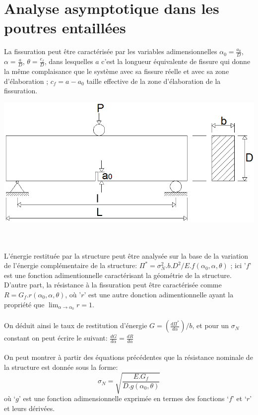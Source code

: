 \documentclass[12pt]{report}
\begin{document}
\section{Analyse asymptotique dans les poutres entaillées}
La fissuration peut être caractérisée
par les variables adimensionnelles $\alpha_0 = \frac{a_0}{D}$, $\alpha = \frac{a}{D}$, $\theta = \frac{c_f}{D}$, dans lesquelles \og$a$\fg{} c'est la longueur équivalente de fissure qui donne la même complaisance que le système avec sa fissure réelle et
avec sa zone d'élaboration ; $c_f=a-a_0$ taille effective de la zone d'élaboration de la fissuration.
\\
\begin{center}
\includegraphics[scale=0.5]{figure1}
\end{center}
\\\\
L'énergie restituée par la structure peut être analysée sur la base de la variation de
l'énergie complémentaire de la structure: $\Pi^* = \sigma_{N}^{2}.b.D^2/E.f(\alpha_0, \alpha, \theta)$ ; ici '$f$' est une fonction adimentionnelle caractérisant la géométrie de la structure. D'autre part, la résistance à la
fissuration peut être caractérisée comme $R=G_f.r(\alpha_0, \alpha, \theta)$, où '$r$' est une autre donction adimentionnelle ayant la propriété que $\lim_{\alpha \to \alpha_0} r = 1$.\\\\
On déduit ainsi le taux de restitution d'énergie $G = (\frac{d\Pi^*}{d\alpha})/b$, et pour un $\sigma_N$ constant on peut écrire le suivant: $\frac{dG}{d\alpha} = \frac{dR}{d\alpha}$
\\\\
On peut montrer à partir des équations précédentes que la résistance nominale de la
structure est donnée sous la forme: \[\sigma_N = \sqrt{\frac{E.G_f}{D.g(\alpha_0, \theta)}}\]
où ‘$g$' est une fonction adimensionnelle
exprimée en termes des fonctions ‘$f$' et ‘$r$' et leurs dérivées.
\end{document}
